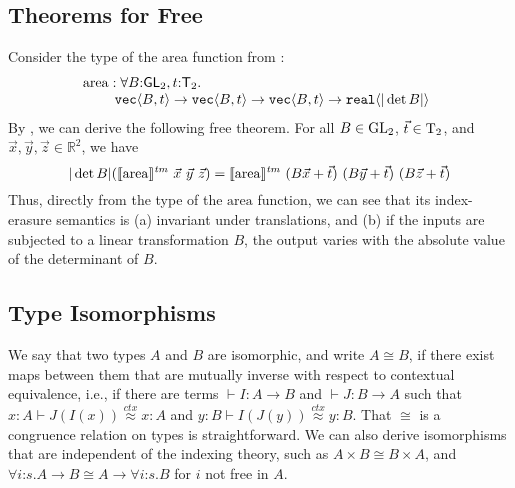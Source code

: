 
\subsection{Theorems for Free}
\label{sec:theorems-for-free}

Consider the type of the area %
function from
:
\begin{displaymath}
  \begin{array}{@{}l}
    \mathrm{area} : \forall B\mathord:\SynGL{2}, t\mathord:\SynTransl{2}.\ \\
    \hspace{0.8cm}\tyPrim{vec}{B, t} \to \tyPrim{vec}{B, t} \to \tyPrim{vec}{B, t} \to \tyPrim{real}{|\det B|}
  \end{array}
\end{displaymath}
By , we can derive the following free theorem. For all $B \in \mathrm{GL}_2$, $\vec{t} \in \mathrm{T}_2$, and $\vec{x}, \vec{y}, \vec{z} \in \mathbb{R}^2$, we have 
\begin{displaymath}
  |\det B|(\tmSem{\mathrm{area}}\ \vec{x}\ \vec{y}\ \vec{z}) = \tmSem{\mathrm{area}}\ (B\vec{x} + \vec{t})\ (B\vec{y} + \vec{t})\ (B\vec{z} + \vec{t})
\end{displaymath}
Thus, directly from the type of the $\mathrm{area}$ function, we can
see that its index-erasure semantics is (a) invariant under
translations, and (b) if the inputs are subjected to a linear
transformation $B$, the output varies with the absolute value of the
determinant of $B$.




\subsection{Type Isomorphisms}
\label{sec:types-indexed-abelian-groups}
We say that two types $A$ and $B$ are isomorphic, and write $A \cong
B$, if there exist maps between them that are mutually inverse with
respect to contextual equivalence, i.e., if there are terms $\vdash I
: A \to B$ and $\vdash J : B\to A$ such that $x:A\vdash
J(I(x))\stackrel{ctx}\approx x : A$ and $y:B\vdash
I(J(y))\stackrel{ctx}\approx y : B$.
That $\cong$ is a congruence relation on types is straightforward. We
can also derive isomorphisms that are independent of the indexing
theory, such as $A\times B \cong B \times A$, and $\forall
i\mathord:s.A\to B\cong A\to\forall i\mathord:s.B$ for $i$ not free in
$A$.

